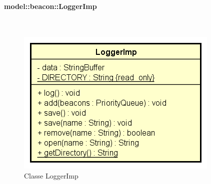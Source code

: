 \documentclass[../DefinizioneDiProdotto.tex]{subfiles}
\begin{document}
\paragraph{model::beacon::LoggerImp}
\
\begin{figure}[H]
	\centering
	\includegraphics[width=\maxwidth]{img/LoggerImp.png}
	\caption{Classe LoggerImp}\label{fig:model::beacon::LoggerImp} 
\end{figure}
\end{document}

